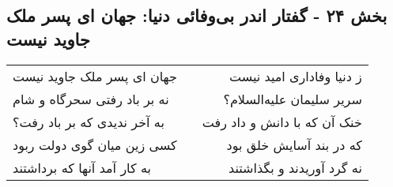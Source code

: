 \begin{center}
\section*{بخش ۲۴ - گفتار اندر بی‌وفائی دنیا: جهان ای پسر ملک جاوید نیست}
\label{sec:024}
\begin{longtable}{l p{0.5cm} r}
جهان ای پسر ملک جاوید نیست
&&
ز دنیا وفاداری امید نیست
\\
نه بر باد رفتی سحرگاه و شام
&&
سریر سلیمان علیه‌السلام؟
\\
به آخر ندیدی که بر باد رفت؟
&&
خنک آن که با دانش و داد رفت
\\
کسی زین میان گوی دولت ربود
&&
که در بند آسایش خلق بود
\\
به کار آمد آنها که برداشتند
&&
نه گرد آوریدند و بگذاشتند
\\
\end{longtable}
\end{center}
